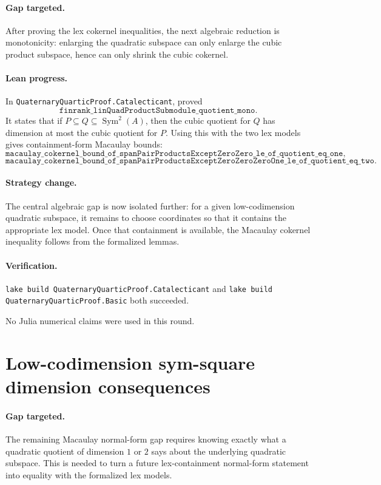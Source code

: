 \documentclass[11pt]{article}
\begin{document}
\paragraph{Gap targeted.}
After proving the lex cokernel inequalities, the next algebraic reduction is
monotonicity: enlarging the quadratic subspace can only enlarge the cubic
product subspace, hence can only shrink the cubic cokernel.

\paragraph{Lean progress.}
In \texttt{QuaternaryQuarticProof.Catalecticant}, proved
\[
\texttt{finrank\_linQuadProductSubmodule\_quotient\_mono}.
\]
It states that if \(P\subseteq Q\subseteq \operatorname{Sym}^2(A)\), then the
cubic quotient for \(Q\) has dimension at most the cubic quotient for \(P\).
Using this with the two lex models gives containment-form Macaulay bounds:
\[
\texttt{macaulay\_cokernel\_bound\_of\_spanPairProductsExceptZeroZero\_le\_of\_quotient\_eq\_one},
\]
\[
\texttt{macaulay\_cokernel\_bound\_of\_spanPairProductsExceptZeroZeroZeroOne\_le\_of\_quotient\_eq\_two}.
\]

\paragraph{Strategy change.}
The central algebraic gap is now isolated further: for a given low-codimension
quadratic subspace, it remains to choose coordinates so that it contains the
appropriate lex model.  Once that containment is available, the Macaulay
cokernel inequality follows from the formalized lemmas.

\paragraph{Verification.}
\texttt{lake build QuaternaryQuarticProof.Catalecticant} and
\texttt{lake build QuaternaryQuarticProof.Basic} both succeeded.

No Julia numerical claims were used in this round.

\section*{Low-codimension sym-square dimension consequences}

\paragraph{Gap targeted.}
The remaining Macaulay normal-form gap requires knowing exactly what a
quadratic quotient of dimension \(1\) or \(2\) says about the underlying
quadratic subspace.  This is needed to turn a future lex-containment
normal-form statement into equality with the formalized lex models.
\end{document}
